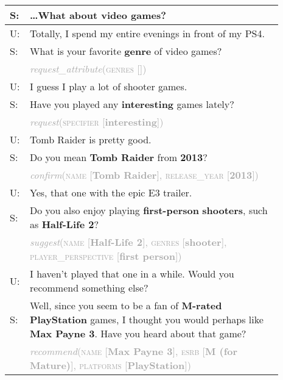 \documentclass[11pt,a4paper]{article}
\begin{document}
\begin{table}
    \small
   	\centering
   	\def\arraystretch{1.5}
    \begin{tabular}{p{0.02\linewidth} >{\raggedright\arraybackslash}p{0.87\linewidth}}
		\hline
    	S:  & \dots What about video games? \\
    	\hline
    	\rowcolor{light-gray}
    	U:  & Totally, I spend my entire evenings in front of my PS4. \\
    	\hline
    	S:  & What is your favorite \textbf{genre} of video games? \\
    	& \textcolor{darkgray}{\emph{request\_attribute}(\textsc{genres} [])} \\
    	\hline
    	\rowcolor{light-gray}
    	U:  & I guess I play a lot of shooter games. \\
    	\hline
    	S:  & Have you played any \textbf{interesting} games lately? \\
    	& \textcolor{darkgray}{\emph{request}(\textsc{specifier} [\textbf{interesting}])} \\
    	\hline
    	\rowcolor{light-gray}
    	U:  & Tomb Raider is pretty good. \\
    	\hline
    	S:  & Do you mean \textbf{Tomb Raider} from \textbf{2013}? \\
    	& \textcolor{darkgray}{\emph{confirm}(\textsc{name} [\textbf{Tomb Raider}], \textsc{release\_year} [\textbf{2013}])} \\
    	\hline
    	\rowcolor{light-gray}
    	U:  & Yes, that one with the epic E3 trailer. \\
    	\hline
    	S:  & Do you also enjoy playing \textbf{first-person} \textbf{shooters}, such as \textbf{Half-Life 2}? \\
    	& \textcolor{darkgray}{\emph{suggest}(\textsc{name} [\textbf{Half-Life 2}], \textsc{genres} [\textbf{shooter}], \textsc{player\_perspective} [\textbf{first person}])} \\
    	\hline
    	\rowcolor{light-gray}
    	U:  & I haven't played that one in a while. Would you recommend something else? \\
    	\hline
    	S:  & Well, since you seem to be a fan of \textbf{M-rated} \textbf{PlayStation} games, I thought you would perhaps like \textbf{Max Payne 3}. Have you heard about that game? \\
    	& \textcolor{darkgray}{\emph{recommend}(\textsc{name} [\textbf{Max Payne 3}], \textsc{esrb} [\textbf{M (for Mature)}], \textsc{platforms} [\textbf{PlayStation}])} \\

\end{tabular}
\end{table}
\end{document}
